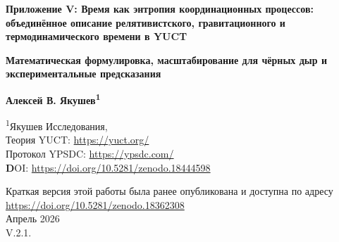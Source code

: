 \documentclass[12pt,a4paper]{article}
\newcommand{\Keff}{K_{\mathrm{eff}}}
\begin{document}
	
	\begin{titlepage}
		\begin{center}
			\vspace*{1cm}
			
			\Huge\textbf{Приложение V: Время как энтропия координационных процессов: объединённое описание релятивистского, гравитационного и термодинамического времени в YUCT}
			
			\vspace{1cm}
			\Large\textbf{Математическая формулировка, масштабирование для чёрных дыр и экспериментальные предсказания}
			
			\vspace{1.5cm}
			
			\Large\textbf{Алексей В. Якушев\textsuperscript{1}}
			
			\vspace{0.3cm}
			\large
			\textsuperscript{1}Якушев Исследования, \\	Теория YUCT: \url{https://yuct.org/}\\
			Протокол YPSDC: \url{https://ypsdc.com/}\\
			
			\vspace{2cm}
			\textbf DOI: \url{https://doi.org/10.5281/zenodo.18444598}\\
			
			\vspace{1cm}
			
			\vspace{0cm}
			\large 
			Краткая версия этой работы была ранее опубликована и доступна по адресу\\ \url{https://doi.org/10.5281/zenodo.18362308}\\
			\vspace{1cm}
			Апрель 2026 \\ \large V.2.1.
			
			\vspace{2cm}
			
			\begin{minipage}{0.9\textwidth}
				\begin{abstract}
					\noindent
					В этом приложении представлена новая интерпретация времени в рамках объединяющей теории координации Якушева (YUCT). Время отождествляется с энтропией координационных процессов, количественно выражаемой через эффективность координации \(\Keff\). Мы показываем, что лоренц-фактор \(\gamma\) в специальной теории относительности и гравитационное замедление времени в общей теории относительности естественным образом возникают как конкретные формы \(\Keff\). Выводится единое выражение для собственного времени \(d\tau = dt/\Keff(v,\Phi)\), которое в соответствующих пределах переходит в стандартные формулы. Для фотона (\(v=c\)) \(\Keff \to \infty\) и собственное время обращается в ноль, что объясняет, почему свет не испытывает времени. Квантование энтропии координации приводит к фундаментальной дискретности времени на планковском масштабе, связывая теорию с квантовой гравитацией.
					

\end{abstract}
\end{minipage}
\end{center}
\end{titlepage}
\end{document}
